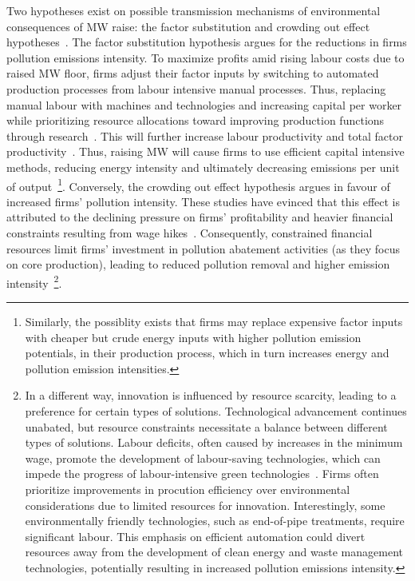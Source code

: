 \documentclass[12pt, english]{article}
\begin{document}
    Two hypotheses exist on possible transmission mechanisms of environmental consequences of MW raise: the factor substitution and crowding out effect hypotheses~\parencite{zhang2023unintended}. The factor substitution hypothesis argues for the reductions in firms pollution emissions intensity. To maximize profits amid rising labour costs due to raised MW floor, firms adjust their factor inputs by switching to automated production processes from labour intensive manual processes. Thus, replacing manual labour with machines and technologies and increasing capital per worker while prioritizing resource allocations toward improving production functions through research~\parencite{harasztosi2019pays,hau2020firm, geng2022minimum,dai2023minimum, li2020labor}. This will further increase labour productivity and total factor productivity~\parencite{riley2017raising}. Thus, raising MW will cause firms to use efficient capital intensive methods, reducing energy intensity and ultimately decreasing emissions per unit of output~\footnote{\tiny Similarly, the possiblity exists that firms may replace expensive factor inputs with cheaper but crude energy inputs with higher pollution emission potentials, in their production process, which in turn increases energy and pollution emission intensities.}. Conversely, the crowding out effect hypothesis argues in favour of increased firms' pollution intensity. These studies have evinced that this effect is attributed to the declining pressure on firms' profitability and heavier financial constraints resulting from wage hikes~\parencite{draca2011minimum, bell2018minimum, du2022minimum}. Consequently, constrained financial resources limit firms' investment in pollution abatement activities (as they focus on core production), leading to reduced pollution removal and higher emission intensity~\footnote{\tiny In a different way, innovation is influenced by resource scarcity, leading to a preference for certain types of solutions. Technological advancement continues unabated, but resource constraints necessitate a balance between different types of solutions. Labour deficits, often caused by increases in the minimum wage, promote the development of labour-saving technologies, which can impede the progress of labour-intensive green technologies~\parencite{acemoglu2010does}. Firms often prioritize improvements in procution efficiency over environmental considerations due to limited resources for innovation. Interestingly, some environmentally friendly technologies, such as end-of-pipe treatments, require significant labour. This emphasis on efficient automation could divert resources away from the development of clean energy and waste management technologies, potentially resulting in increased pollution emissions intensity.}.
\end{document}
